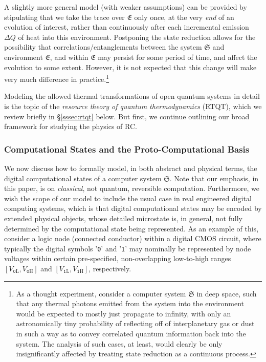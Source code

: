 \documentclass[preprints,article,accept,moreauthors,pdftex]{Definitions/mdpi}
\begin{document}
A slightly more general model (with weaker assumptions) can be provided by stipulating that we take the trace over $\mathfrak{E}$ only once, at the very \emph{end} of an evolution of interest, rather than continuously after each incremental emission $\Delta Q$ of heat into this environment. Postponing the state reduction allows for the possibility that correlations/entanglements between the system $\mathfrak{S}$ and environment $\mathfrak{E}$, and within $\mathfrak{E}$ may persist for some period of time, and affect the evolution to some extent. However, it is not expected that this change will make very much difference in practice.\footnote{As a thought experiment, consider a computer system $\mathfrak{S}$ in deep space, such that any thermal photons emitted from the system into the environment would be expected to mostly just propagate to infinity, with only an astronomically tiny probability of reflecting off of interplanetary gas or dust in such a way as to convey correlated quantum information back into the system. The analysis of such cases, at least, would clearly be only insignificantly affected by treating state reduction as a continuous process.}


Modeling the allowed thermal transformations of open quantum systems in detail is the topic of the \textit{resource theory of quantum thermodynamics} (RTQT), which we review briefly in \S\ref{sssec:rtqt} below. But first, we continue outlining our broad framework for studying the physics of RC.

\subsubsection{Computational States and the Proto-Computational Basis}
\label{sssec:comp-states}

We now discuss how to formally model, in both abstract and physical terms, the digital computational states of a computer system $\mathfrak{S}$.
Note that our emphasis, in this paper, is on {\em classical}, not quantum, reversible computation. Furthermore, we wish the scope of our model to include the usual case in real engineered digital computing systems, which is that digital computational states may be encoded by extended physical objects, whose detailed microstate is, in general, not fully determined by the computational state being represented. As an example of this, consider a logic node (connected conductor) within a digital CMOS circuit, where typically the digital symbols '\texttt{0}' and '\texttt{1}' may nominally be represented by node voltages within certain pre-specified, non-overlapping low-to-high ranges $[V_{\mathtt{0}\mathrm{L}},V_{\mathtt{0}\mathrm{H}}]$ and $[V_{\mathtt{1}\mathrm{L}},V_{\mathtt{1}\mathrm{H}}]$, respectively.
\end{document}
